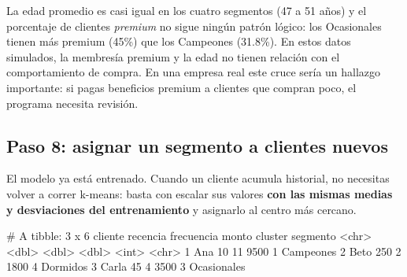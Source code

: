La edad promedio es casi igual en los cuatro segmentos (47 a 51 años) y el
porcentaje de clientes \emph{premium} no sigue ningún patrón lógico: los
Ocasionales tienen más premium (45\%) que los Campeones (31.8\%). En estos datos
simulados, la membresía premium y la edad no tienen relación con el
comportamiento de compra. En una empresa real este cruce sería un hallazgo
importante: si pagas beneficios premium a clientes que compran poco, el
programa necesita revisión.

\subsection{Paso 8: asignar un segmento a clientes nuevos}

El modelo ya está entrenado. Cuando un cliente acumula historial, no necesitas
volver a correr k-means: basta con escalar sus valores \textbf{con las mismas
medias y desviaciones del entrenamiento} y asignarlo al centro más cercano.


\begin{rsalida}
# A tibble: 3 x 6
  cliente recencia frecuencia monto cluster segmento   
  <chr>      <dbl>      <dbl> <dbl>   <int> <chr>      
1 Ana           10         11  9500       1 Campeones  
2 Beto         250          2  1800       4 Dormidos   
3 Carla         45          4  3500       3 Ocasionales
\end{rsalida}

